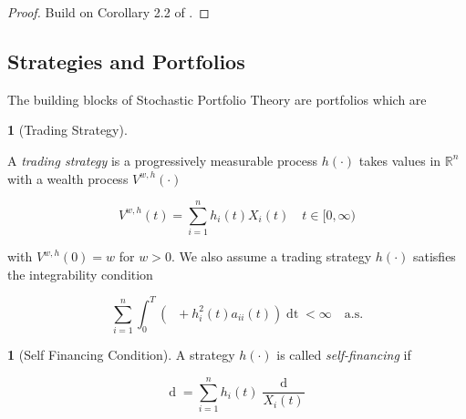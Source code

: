 \documentclass[british]{amsart}
\numberwithin{equation}{section}
\numberwithin{figure}{section}
\theoremstyle{plain}
\theoremstyle{definition}
\newtheorem{defn}[thm]{\protect\definitionname}
\theoremstyle{plain}
\theoremstyle{plain}
\theoremstyle{plain}
\theoremstyle{remark}
\theoremstyle{plain}
\providecommand{\definitionname}{Definition}
\renewcommand{\d}[1]{\mathop{\mathrm{d}{#1}}}
\newcommand{\ranget}{t\in[0,\infty)}
\newcommand{\defeq}{\mathop{\triangleq}}
\newcommand{\almostsurely}{\text{a.s.}}
\newcommand{\abs}[1]{\mathop{|{#1}|}}
\begin{document}
\begin{proof}
	Build on Corollary 2.2 of \cite{fernholz1999pgf}.
\end{proof}

\subsection{Strategies and Portfolios}

The building blocks of Stochastic Portfolio Theory are portfolios which are 


\begin{defn} [Trading Strategy]
	\label{def:tradingstrategy}

	A \textit{trading strategy} is a progressively measurable process $h(\cdot)$ 
	takes values in $\mathbb{R}^{n}$ with a wealth process $V^{w,h}(\cdot)$ 

 	\begin{equation*}
		V^{w,h}(t) = \sum_{i=1}^{n} h_{i}(t) X_{i}(t) 
		\quad \ranget
	\end{equation*}

	with $V^{w,h}(0)=w$ for $w > 0$. We also assume a trading strategy $h(\cdot)$  
	satisfies the integrability condition

 	\begin{equation*}
		\sum_{i=1}^{n} \int_{0}^{T} 
		\left(
		\abs{(h_{i}(t)b_{i}(t)} + h_{i}^2(t)a_{ii}(t)
			\right) \d{t} < \infty
		\quad	\almostsurely
	\end{equation*}

\end{defn}

\begin{defn} [Self Financing Condition]
	\label{def:selffinancingcondition}	
	A strategy $h(\cdot)$ is called \textit{self-financing} if 
	
	\begin{equation}
		\d{V^{w,\pi}(t)} = \sum_{i=1}^{n} h_{i}(t) \frac{\d{X_{i}(t)}}{X_{i}(t)}
 	\end{equation}

\end{defn}


%
%
%
%
\end{document}
